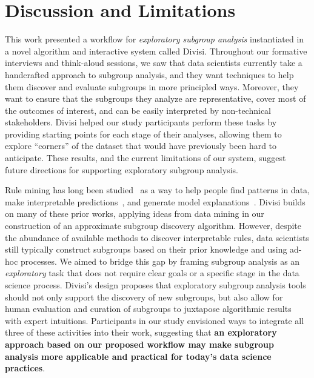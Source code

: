 \section{Discussion and Limitations}
\label{sec:discussion}

This work presented a workflow for \textit{exploratory subgroup analysis} instantiated in a novel algorithm and interactive system called Divisi.
Throughout our formative interviews and think-aloud sessions, we saw that data scientists currently take a handcrafted approach to subgroup analysis, and they want techniques to help them discover and evaluate subgroups in more principled ways.
Moreover, they want to ensure that the subgroups they analyze are representative, cover most of the outcomes of interest, and can be easily interpreted by non-technical stakeholders.
Divisi helped our study participants perform these tasks by providing starting points for each stage of their analyses, allowing them to explore ``corners'' of the dataset that would have previously been hard to anticipate.
These results, and the current limitations of our system, suggest future directions for supporting exploratory subgroup analysis.

Rule mining has long been studied~\cite{han_mining_2000} as a way to help people find patterns in data, make interpretable predictions~\cite{furnkranz_brief_2015}, and generate model explanations~\cite{ribeiro_anchors_2018}.
Divisi builds on many of these prior works, applying ideas from data mining in our construction of an approximate subgroup discovery algorithm.
However, despite the abundance of available methods to discover interpretable rules, data scientists still typically construct subgroups based on their prior knowledge and using ad-hoc processes.
We aimed to bridge this gap by framing subgroup analysis as an \textit{exploratory} task that does not require clear goals or a specific stage in the data science process.
Divisi's design proposes that exploratory subgroup analysis tools should not only support the discovery of new subgroups, but also allow for human evaluation and curation of subgroups to juxtapose algorithmic results with expert intuitions.
Participants in our study envisioned ways to integrate all three of these activities into their work, suggesting that \textbf{an exploratory approach based on our proposed workflow may make subgroup analysis more applicable and practical for today's data science practices}. %

